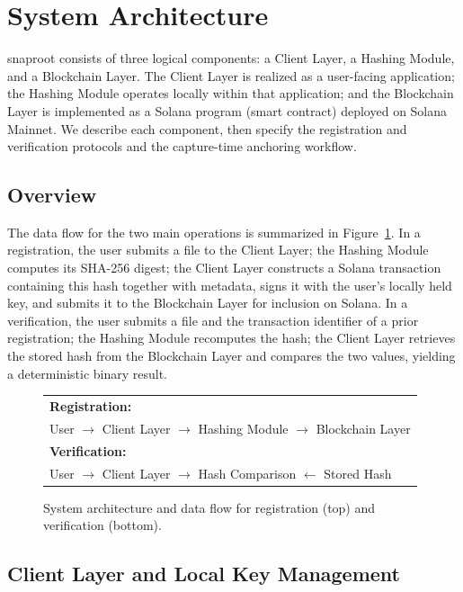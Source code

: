 \documentclass[11pt,a4paper]{article}
\begin{document}
\section{System Architecture}
\label{sec:architecture}

snaproot consists of three logical components: a Client Layer, a
Hashing Module, and a Blockchain Layer. The Client Layer is realized as
a user-facing application; the Hashing Module operates locally within
that application; and the Blockchain Layer is implemented as a Solana
program (smart contract) deployed on Solana Mainnet. We describe each
component, then specify the registration and verification protocols
and the capture-time anchoring workflow.

\subsection{Overview}
\label{sec:architecture:overview}

The data flow for the two main operations is summarized in
Figure~\ref{fig:flow}. In a registration, the user submits a file to
the Client Layer; the Hashing Module computes its SHA-256 digest; the
Client Layer constructs a Solana transaction containing this hash
together with metadata, signs it with the user's locally held key, and
submits it to the Blockchain Layer for inclusion on Solana. In a
verification, the user submits a file and the transaction identifier
of a prior registration; the Hashing Module recomputes the hash; the
Client Layer retrieves the stored hash from the Blockchain Layer and
compares the two values, yielding a deterministic binary result.

\begin{figure}[ht]
\centering
\small
\begin{tabular}{l}
\textbf{Registration:}\\
\quad User $\to$ Client Layer $\to$ Hashing Module $\to$ Blockchain Layer\\[0.5em]
\textbf{Verification:}\\
\quad User $\to$ Client Layer $\to$ Hash Comparison $\leftarrow$ Stored Hash\\
\end{tabular}
\caption{System architecture and data flow for registration (top) and
verification (bottom).}
\label{fig:flow}
\end{figure}

\subsection{Client Layer and Local Key Management}
\label{sec:architecture:client}
\end{document}
